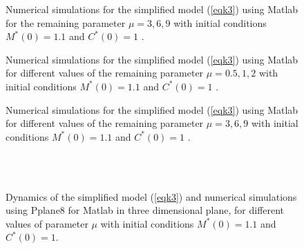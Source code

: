 \documentclass[a4paper,12pt]{article}
\begin{document}
\begin{figure}[ht]         
      \begin{center}    
    \end{center}       
\caption {Numerical simulations for the simplified model (\ref{eqk3}) using Matlab for the remaining parameter $\mu = 3 ,6, 9$  with initial conditions $M^{*}(0)=1.1$ and $C^{*}(0)=1$ .}  
   \label{f3}  
\end{figure} 
\clearpage
\begin{figure}[ht]         
      \begin{center}    
    \end{center}       
\caption {Numerical simulations for the simplified model (\ref{eqk3}) using Matlab for different values of the remaining parameter $\mu = 0.5 ,1, 2$  with initial conditions $M^{*}(0)=1.1$ and $C^{*}(0)=1$ .}  
   \label{f4}  
\end{figure} 

\begin{figure}[ht]          
      \begin{center}    
    \end{center}       
\caption {Numerical simulations for the simplified model (\ref{eqk3}) using Matlab for different values of the remaining parameter $\mu = 3 ,6, 9$  with initial conditions $M^{*}(0)=1.1$ and $C^{*}(0)=1$ .}  
   \label{f5}  
\end{figure} 
  
\clearpage
\begin{figure}[ht]         
      \begin{center}    
        \\    
        \\    
    \end{center}         
\caption {Dynamics of the simplified model (\ref{eqk3}) and numerical simulations using  Pplane8 for Matlab in three dimensional plane, for different values of parameter $\mu$ with initial conditions $M^{*}(0)=1.1$ and $C^{*}(0)=1$.}  
   \label{f8}    
\end{figure}
\clearpage
\end{document}
